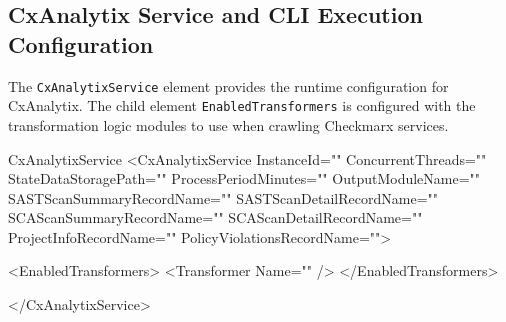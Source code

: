 \subsection{CxAnalytix Service and CLI Execution Configuration}\label{sec:runtime_config}

The \texttt{CxAnalytixService} element provides the runtime configuration for CxAnalytix.  The child element \texttt{EnabledTransformers}
is configured with the transformation logic modules to use when crawling Checkmarx services.

\begin{xml}{CxAnalytixService}{\expandsenv}{}
<CxAnalytixService
    InstanceId=""
    ConcurrentThreads=""
    StateDataStoragePath=""
    ProcessPeriodMinutes=""
    OutputModuleName=""
    SASTScanSummaryRecordName=""
    SASTScanDetailRecordName=""
    SCAScanSummaryRecordName=""
    SCAScanDetailRecordName=""
    ProjectInfoRecordName=""
    PolicyViolationsRecordName="">

    <EnabledTransformers>
        <Transformer Name="" />
    </EnabledTransformers>

</CxAnalytixService>
\end{xml}
        
